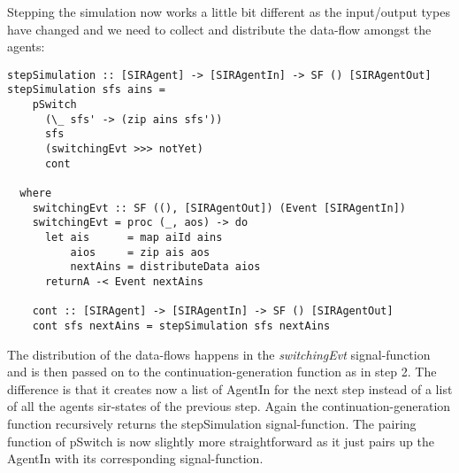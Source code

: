 Stepping the simulation now works a little bit different as the input/output types have changed and we need to collect and distribute the data-flow amongst the agents:

\begin{verbatim}
stepSimulation :: [SIRAgent] -> [SIRAgentIn] -> SF () [SIRAgentOut]
stepSimulation sfs ains =
    pSwitch
      (\_ sfs' -> (zip ains sfs'))
      sfs
      (switchingEvt >>> notYet)
      cont

  where
    switchingEvt :: SF ((), [SIRAgentOut]) (Event [SIRAgentIn])
    switchingEvt = proc (_, aos) -> do
      let ais      = map aiId ains
          aios     = zip ais aos
          nextAins = distributeData aios
      returnA -< Event nextAins

    cont :: [SIRAgent] -> [SIRAgentIn] -> SF () [SIRAgentOut]
    cont sfs nextAins = stepSimulation sfs nextAins
\end{verbatim}

The distribution of the data-flows happens in the \textit{switchingEvt} signal-function and is then passed on to the continuation-generation function as in step 2. The difference is that it creates now a list of AgentIn for the next step instead of a list of all the agents sir-states of the previous step. Again the continuation-generation function recursively returns the stepSimulation signal-function. The pairing function of pSwitch is now slightly more straightforward as it just pairs up the AgentIn with its corresponding signal-function.

